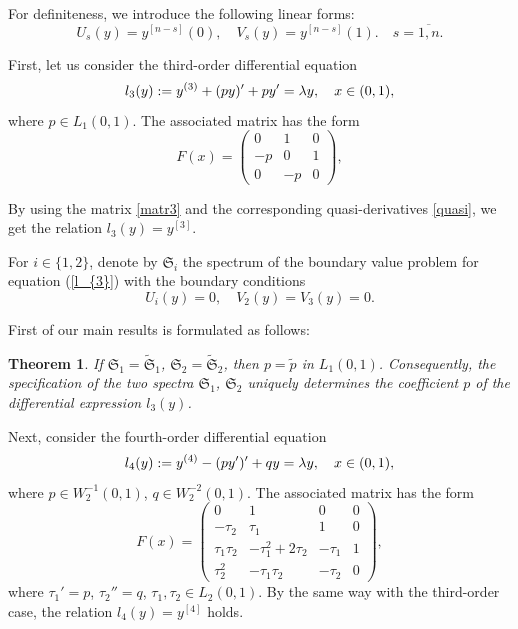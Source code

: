 \documentclass[reqno,12pt,centertags]{amsart}
\numberwithin{equation}{section}
\newtheorem{theorem}{Theorem}[section]
\theoremstyle{definition}
\begin{document}
	For definiteness, we introduce the following linear forms:
	\begin{equation} \label{UV_simp}
			U_{s}(y)=y^{[n-s]}(0), \quad
			V_{s}(y)=y^{[n-s]}(1).  \quad s = \overline{1,n}.
	\end{equation}
	
	First, let us consider the third-order differential equation
	\begin{equation}\label{l_{3}}
		l_{3}(y) := y^{(3)}+(py)'+py' = \lambda y, \quad x\in (0,1),
	\end{equation}
    where $p \in L_1(0,1)$. The associated matrix has the form
    \begin{equation}\label{matr3}
	F(x)=\begin{pmatrix} 0 & 1 & 0 \\ -p & 0 & 1  \\ 0 & -p & 0\end{pmatrix},
    \end{equation}
        
	By using the matrix \eqref{matr3} and the corresponding quasi-derivatives \eqref{quasi}, we get the relation $l_{3}(y)=y^{[3]}$.
	

For $i\in \{1, 2\}$, denote by $\mathfrak{S}_{i}$ the spectrum of the boundary value problem for equation (\ref{l_{3}}) with the boundary conditions
	\begin{equation*}
		U_{i}(y)=0, \quad V_{2}(y)=V_{3}(y)=0.
	\end{equation*}

 First of our main results is formulated as follows:

\begin{theorem}\label{thm:main1}
	If $\mathfrak{S}_{1}=\tilde{\mathfrak{S}}_{1}$, $\mathfrak{S}_{2}=\tilde{\mathfrak{S}}_{2}$, then $p=\tilde{p}$ in $L_1(0,1)$. Consequently, the specification of the two spectra $\mathfrak{S}_{1}$, $\mathfrak{S}_{2}$ uniquely determines the coefficient $p$ of the differential expression $l_{3}(y)$.
\end{theorem}
	
	Next, consider the fourth-order differential equation
	\begin{equation}\label{l_{4}}
		l_{4}(y):= y^{(4)}-(py')'+qy = \lambda y, \quad x\in (0,1),
	\end{equation}
where $p \in W_{2}^{-1}(0, 1)$, $q \in W_{2}^{-2}(0, 1)$. 
The associated matrix has the form
\begin{equation} \label{matr4}
	F(x)=\begin{pmatrix} 0 & 1 & 0 & 0\\ -\tau_{2} & \tau_{1} & 1 & 0 \\ \tau_{1}\tau_{2} & -\tau_{1}^{2}+2\tau_{2} & -\tau_{1} & 1 \\ \tau_{2}^{2} & -\tau_{1}\tau_{2} & -\tau_{2} & 0\end{pmatrix},
\end{equation}
where $\tau_{1}'=p$, $\tau_{2}''=q$, $\tau_1, \tau_2 \in L_2(0,1)$.
By the same way with the third-order case, the relation $l_{4}(y)=y^{[4]}$ holds. 
	
\end{document}
